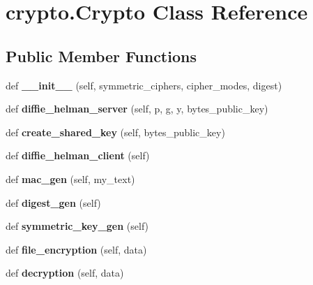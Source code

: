 \hypertarget{classcrypto_1_1Crypto}{}\section{crypto.\+Crypto Class Reference}
\label{classcrypto_1_1Crypto}
\subsection*{Public Member Functions}
\begin{DoxyCompactItemize}
\item 
\mbox{\label{classcrypto_1_1Crypto_a308b9393b0605d3e9ba35fe0141e3e96}} 
def {\bfseries \+\_\+\+\_\+init\+\_\+\+\_\+} (self, symmetric\+\_\+ciphers, cipher\+\_\+modes, digest)
\item 
\mbox{\label{classcrypto_1_1Crypto_a84fb932cab5a69963f403f8f0e9823e3}} 
def {\bfseries diffie\+\_\+helman\+\_\+server} (self, p, g, y, bytes\+\_\+public\+\_\+key)
\item 
\mbox{\label{classcrypto_1_1Crypto_acfded032494c4f288f51f6917676f31c}} 
def {\bfseries create\+\_\+shared\+\_\+key} (self, bytes\+\_\+public\+\_\+key)
\item 
\mbox{\label{classcrypto_1_1Crypto_acdf476d5a7bc8dd9c54a5b70c4a14c4a}} 
def {\bfseries diffie\+\_\+helman\+\_\+client} (self)
\item 
\mbox{\label{classcrypto_1_1Crypto_a301ee417a54a2e4bea732522ceeca56f}} 
def {\bfseries mac\+\_\+gen} (self, my\+\_\+text)
\item 
\mbox{\label{classcrypto_1_1Crypto_a064019638a5a70699162fe430ee6a793}} 
def {\bfseries digest\+\_\+gen} (self)
\item 
\mbox{\label{classcrypto_1_1Crypto_a476eac6eece8dcd1bfc037d8811f5a92}} 
def {\bfseries symmetric\+\_\+key\+\_\+gen} (self)
\item 
\mbox{\label{classcrypto_1_1Crypto_ab861fcd148cb3698c3cfc03e624f3cbc}} 
def {\bfseries file\+\_\+encryption} (self, data)
\item 
\mbox{\label{classcrypto_1_1Crypto_a3b65450a119247cc56e3de883a85dcf0}} 
def {\bfseries decryption} (self, data)
\end{DoxyCompactItemize}
